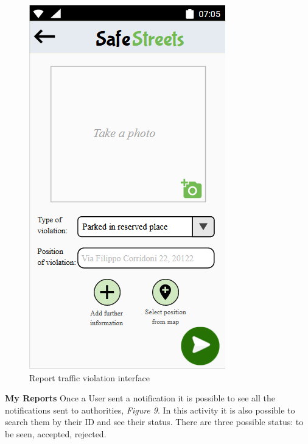         \begin{figure}[h]
        \centering
        \includegraphics[scale=0.85]{Images/report_violation.png}
        \caption{Report traffic violation interface}
    \end{figure}
    \textbf{My Reports}\newline
    Once a User sent a notification it is possible to see all the notifications sent to authorities, \textit{Figure 9}. In this activity it is also possible to search them by their ID and see their status. There are three possible status: to be seen, accepted, rejected.
